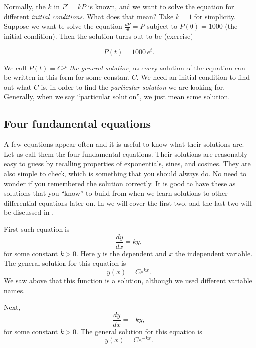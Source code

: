 \documentclass{ximera}
\begin{document}
Normally, the $k$ in $P' = kP$ is known, and we want to solve the equation for different \emph{initial conditions}. What does that mean? Take $k=1$ for simplicity.  Suppose we want to solve the equation
$\frac{dP}{dt} = P$  subject to $P(0) = 1000$ (the initial condition). Then the solution turns out to be (exercise)

\begin{equation*}
    P(t) = 1000 \, e^t .
\end{equation*}


We call $P(t) = C e^t$ \emph{the general solution}, as every solution of the equation can be written in this form for some constant $C$.  We need an initial condition to find out what $C$ is, in order to find the \emph{particular solution} we are looking for.  Generally, when we say ``particular solution'', we just mean some solution.

\subsection{Four fundamental equations} \label{subsection:fourfundamental}

A few equations appear often and it is useful to know what their solutions are. Let us call them the four fundamental equations. Their solutions are reasonably easy to guess by recalling properties of exponentials, sines, and cosines. They are also simple to check, which is something that you should always do. No need to wonder if you remembered the solution correctly. It is good to have these as solutions that you ``know'' to build from when we learn solutions to other differential equations later on. In  we will cover the first two, and the last two will be discussed in . 


First such equation is
\begin{equation*}
    \frac{dy}{dx} = k y ,
\end{equation*}
for some constant $k > 0$. Here $y$ is the dependent and $x$ the independent variable. The general solution for this equation is
\begin{equation*}
    y(x) = C e^{kx} .
\end{equation*}
We saw above that this function is a solution, although we used different variable names.


Next,
\begin{equation*}
    \frac{dy}{dx} = -k y ,
\end{equation*}
for some constant $k > 0$. The general solution for this equation is
\begin{equation*}
    y(x) = C e^{-kx} .
\end{equation*}
\end{document}
